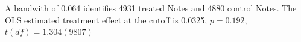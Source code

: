 A bandwith of 0.064 identifies 4931 treated Notes and 4880 control Notes. The OLS estimated treatment effect at the cutoff is 0.0325, $p = 0.192$, $t(df) = 1.304(9807)$
